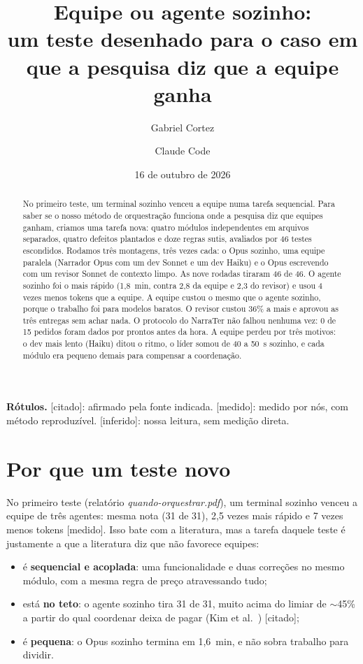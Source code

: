 \documentclass[11pt,a4paper]{article}
\title{Equipe ou agente sozinho:\\[2pt]
\large um teste desenhado para o caso em que a pesquisa diz que a equipe ganha}
\author{Gabriel Cortez \and Claude Code}
\date{16 de outubro de 2026}
\newcommand{\rot}[1]{\textsf{\footnotesize[#1]}}
\begin{document}
\maketitle

\begin{abstract}
\noindent
No primeiro teste, um terminal sozinho venceu a equipe numa tarefa sequencial. Para saber se o
nosso método de orquestração funciona onde a pesquisa diz que equipes ganham, criamos uma tarefa nova:
quatro módulos independentes em arquivos separados, quatro defeitos plantados e doze regras sutis,
avaliados por 46 testes escondidos. Rodamos três montagens, três vezes cada: o Opus sozinho, uma equipe
paralela (Narrador Opus com um dev Sonnet e um dev Haiku) e o Opus escrevendo com um revisor Sonnet de
contexto limpo. As nove rodadas tiraram 46 de 46. O agente sozinho foi o mais rápido (1,8~min, contra
2,8 da equipe e 2,3 do revisor) e usou 4 vezes menos tokens que a equipe. A equipe custou o mesmo que o
agente sozinho, porque o trabalho foi para modelos baratos. O revisor custou 36\% a mais e aprovou as
três entregas sem achar nada. O protocolo do NarraTer não falhou nenhuma vez: 0 de 15 pedidos foram dados
por prontos antes da hora. A equipe perdeu por três motivos: o dev mais lento (Haiku) ditou o ritmo, o
líder somou de 40 a 50~s sozinho, e cada módulo era pequeno demais para compensar a coordenação.
\end{abstract}

\noindent\textbf{Rótulos.} \rot{citado}: afirmado pela fonte indicada. \rot{medido}: medido por nós,
com método reproduzível. \rot{inferido}: nossa leitura, sem medição direta.

\section{Por que um teste novo}

No primeiro teste (relatório \emph{quando-orquestrar.pdf}), um terminal sozinho venceu a equipe de três
agentes: mesma nota (31 de 31), 2,5 vezes mais rápido e 7 vezes menos tokens \rot{medido}. Isso bate
com a literatura, mas a tarefa daquele teste é justamente a que a literatura diz que não favorece
equipes:
\begin{itemize}
  \item é \textbf{sequencial e acoplada}: uma funcionalidade e duas correções no mesmo módulo, com a
    mesma regra de preço atravessando tudo;
  \item está \textbf{no teto}: o agente sozinho tira 31 de 31, muito acima do limiar de ${\sim}$45\% a
    partir do qual coordenar deixa de pagar (Kim et al.~\cite{kim2025}) \rot{citado};
  \item é \textbf{pequena}: o Opus sozinho termina em 1,6~min, e não sobra trabalho para dividir.
\end{itemize}
\end{document}
